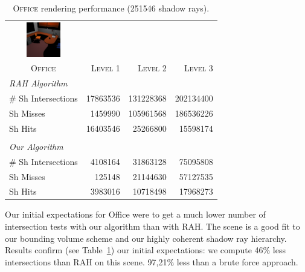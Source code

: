 \begin{table}[!htb]
\begin{center}
\fontsize{7}{9}
\selectfont
\begin{tabular}{l|rrr}
    \multicolumn{1}{c}{\includegraphics[width=1.5cm]{Images/Office_Preview}} & & \\
    \multicolumn{1}{c|}{\textsc{Office}} & \textsc{Level 1} & \textsc{Level 2} & \textsc{Level 3}\\
    \hline
    \emph{RAH Algorithm} & & \\
    \hline
    \quad \# Sh Intersections  & 17863536	 & 131228368    & 202134400  \\
    \quad Sh Misses            & 1459990	 & 105961568    & 186536226	 \\
    \quad Sh Hits              & 16403546	 & 25266800	    & 15598174	 \\

    & & \\

    \hline
    \emph{Our Algorithm} & & \\
    \hline
    \quad \# Sh Intersections   & 4108164	     & 31863128	    & 75095808	 \\
    \quad Sh Misses    & 125148		 & 21144630	    & 57127535	 \\
    \quad Sh Hits & 3983016		 & 10718498	    & 17968273	 \\
\end{tabular}
\end{center}
\caption{\label{table:office-results}
\textsc{Office} rendering performance (251546 shadow rays).}
\end{table}

Our initial expectations for Office were to get a much lower number of intersection tests with our algorithm than with RAH. The scene is a good fit to our bounding volume scheme and our highly coherent shadow ray hierarchy. Results confirm (see Table~\ref{table:office-results}) our initial expectations: we compute 46\% less intersections than RAH on this scene. 97,21\% less than a brute force approach.

